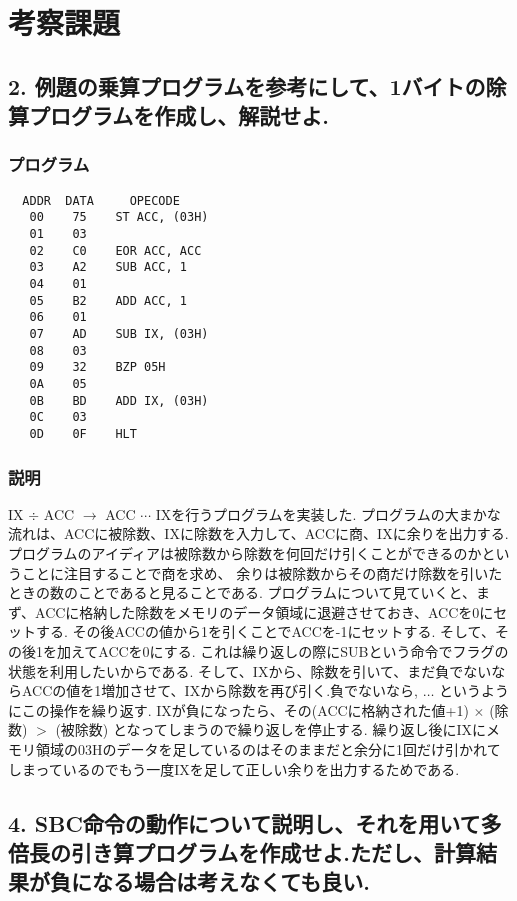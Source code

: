 \documentclass[titlepage]{jsarticle}
\theoremstyle{definition}
\begin{document}
\section{考察課題}

\subsection*{2. 例題の乗算プログラムを参考にして、1バイトの除算プログラムを作成し、解説せよ.}

\subsubsection{プログラム}

\begin{lstlisting}
  ADDR  DATA     OPECODE
   00    75    ST ACC, (03H)
   01    03
   02    C0    EOR ACC, ACC
   03    A2    SUB ACC, 1
   04    01
   05    B2    ADD ACC, 1
   06    01
   07    AD    SUB IX, (03H)
   08    03
   09    32    BZP 05H
   0A    05
   0B    BD    ADD IX, (03H)
   0C    03
   0D    0F    HLT

\end{lstlisting}

\subsubsection{説明}
IX $\div$ ACC $\rightarrow$ ACC $\cdots$ IXを行うプログラムを実装した.
プログラムの大まかな流れは、ACCに被除数、IXに除数を入力して、ACCに商、IXに余りを出力する.
プログラムのアイディアは被除数から除数を何回だけ引くことができるのかということに注目することで商を求め、
余りは被除数からその商だけ除数を引いたときの数のことであると見ることである.
プログラムについて見ていくと、まず、ACCに格納した除数をメモリのデータ領域に退避させておき、ACCを0にセットする.
その後ACCの値から1を引くことでACCを-1にセットする.
そして、その後1を加えてACCを0にする.
これは繰り返しの際にSUBという命令でフラグの状態を利用したいからである.
そして、IXから、除数を引いて、まだ負でないならACCの値を1増加させて、IXから除数を再び引く.負でないなら, $\ldots$ というようにこの操作を繰り返す.
IXが負になったら、その(ACCに格納された値+1) $\times$ (除数) $>$ (被除数) となってしまうので繰り返しを停止する.
繰り返し後にIXにメモリ領域の03Hのデータを足しているのはそのままだと余分に1回だけ引かれてしまっているのでもう一度IXを足して正しい余りを出力するためである.

\subsection*{4. SBC命令の動作について説明し、それを用いて多倍長の引き算プログラムを作成せよ.ただし、計算結果が負になる場合は考えなくても良い.}
\end{document}

